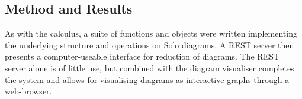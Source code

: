 \subsection{Method and Results}

    As with the calculus, a suite of functions and objects were written implementing the underlying structure and operations on Solo diagrams.
    A REST server then presents a computer-useable interface for reduction of diagrams.
    The REST server alone is of little use, but combined with the diagram visualiser completes the system and allows for visualising diagrams as interactive graphs through a web-browser.
